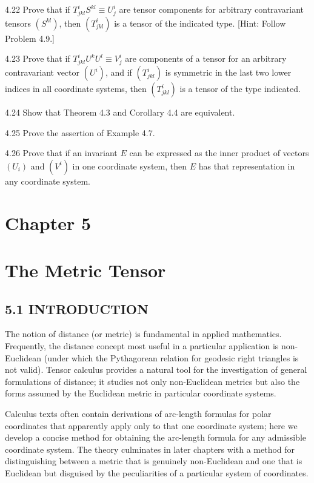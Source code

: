 \documentclass[10pt]{article}
\begin{document}
4.22 Prove that if $T_{j k l}^{i} S^{k l} \equiv U_{j}^{i}$ are tensor components for arbitrary contravariant tensors $\left(S^{k l}\right)$, then $\left(T_{j k l}^{i}\right)$ is a tensor of the indicated type. [Hint: Follow Problem 4.9.]

4.23 Prove that if $T_{j k l}^{i} U^{k} U^{l} \equiv V_{j}^{i}$ are components of a tensor for an arbitrary contravariant vector $\left(U^{i}\right)$, and if $\left(T_{j k l}^{i}\right)$ is symmetric in the last two lower indices in all coordinate systems, then $\left(T_{j k l}^{i}\right)$ is a tensor of the type indicated.

4.24 Show that Theorem 4.3 and Corollary 4.4 are equivalent.

4.25 Prove the assertion of Example 4.7.

4.26 Prove that if an invariant $E$ can be expressed as the inner product of vectors $\left(U_{i}\right)$ and $\left(V^{i}\right)$ in one coordinate system, then $E$ has that representation in any coordinate system.

\section*{Chapter 5}
\section*{The Metric Tensor}
\subsection*{5.1 INTRODUCTION}
The notion of distance (or metric) is fundamental in applied mathematics. Frequently, the distance concept most useful in a particular application is non-Euclidean (under which the Pythagorean relation for geodesic right triangles is not valid). Tensor calculus provides a natural tool for the investigation of general formulations of distance; it studies not only non-Euclidean metrics but also the forms assumed by the Euclidean metric in particular coordinate systems.

Calculus texts often contain derivations of arc-length formulas for polar coordinates that apparently apply only to that one coordinate system; here we develop a concise method for obtaining the arc-length formula for any admissible coordinate system. The theory culminates in later chapters with a method for distinguishing between a metric that is genuinely non-Euclidean and one that is Euclidean but disguised by the peculiarities of a particular system of coordinates.
\end{document}
